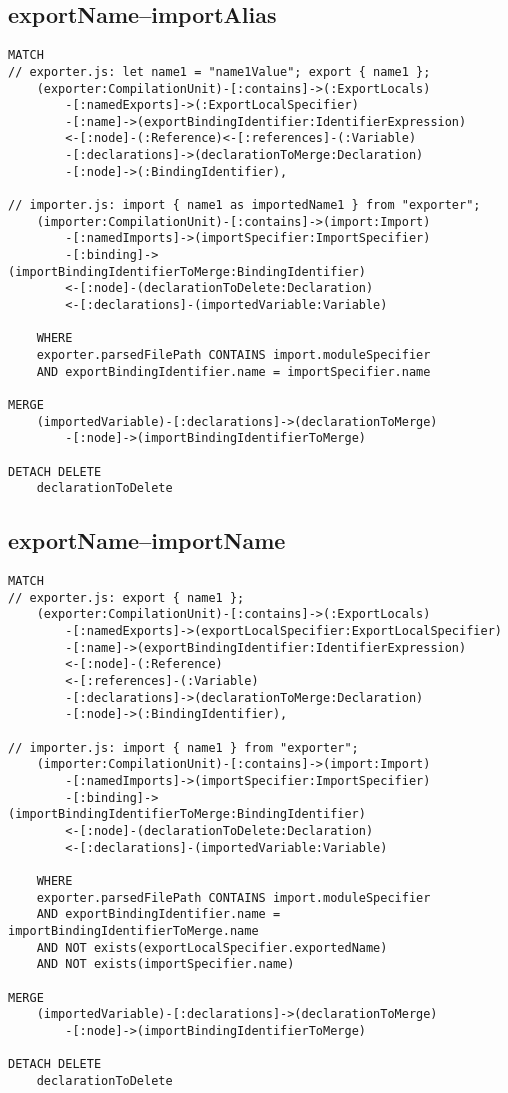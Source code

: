 \newpage
\subsection{exportName–importAlias}
\begin{lstlisting}[language=Cypher]
MATCH
// exporter.js: let name1 = "name1Value"; export { name1 };
    (exporter:CompilationUnit)-[:contains]->(:ExportLocals)
        -[:namedExports]->(:ExportLocalSpecifier)
        -[:name]->(exportBindingIdentifier:IdentifierExpression)
        <-[:node]-(:Reference)<-[:references]-(:Variable)
        -[:declarations]->(declarationToMerge:Declaration)
        -[:node]->(:BindingIdentifier),

// importer.js: import { name1 as importedName1 } from "exporter";
    (importer:CompilationUnit)-[:contains]->(import:Import)
        -[:namedImports]->(importSpecifier:ImportSpecifier)
        -[:binding]->(importBindingIdentifierToMerge:BindingIdentifier)
        <-[:node]-(declarationToDelete:Declaration)
        <-[:declarations]-(importedVariable:Variable)

    WHERE
    exporter.parsedFilePath CONTAINS import.moduleSpecifier
    AND exportBindingIdentifier.name = importSpecifier.name

MERGE
    (importedVariable)-[:declarations]->(declarationToMerge)
        -[:node]->(importBindingIdentifierToMerge)

DETACH DELETE
    declarationToDelete
\end{lstlisting}


\newpage
\subsection{exportName–importName}
\begin{lstlisting}[language=Cypher]
MATCH
// exporter.js: export { name1 };
    (exporter:CompilationUnit)-[:contains]->(:ExportLocals)
        -[:namedExports]->(exportLocalSpecifier:ExportLocalSpecifier)
        -[:name]->(exportBindingIdentifier:IdentifierExpression)
        <-[:node]-(:Reference)
        <-[:references]-(:Variable)
        -[:declarations]->(declarationToMerge:Declaration)
        -[:node]->(:BindingIdentifier),

// importer.js: import { name1 } from "exporter";
    (importer:CompilationUnit)-[:contains]->(import:Import)
        -[:namedImports]->(importSpecifier:ImportSpecifier)
        -[:binding]->(importBindingIdentifierToMerge:BindingIdentifier)
        <-[:node]-(declarationToDelete:Declaration)
        <-[:declarations]-(importedVariable:Variable)

    WHERE
    exporter.parsedFilePath CONTAINS import.moduleSpecifier
    AND exportBindingIdentifier.name = importBindingIdentifierToMerge.name
    AND NOT exists(exportLocalSpecifier.exportedName)
    AND NOT exists(importSpecifier.name)

MERGE
    (importedVariable)-[:declarations]->(declarationToMerge)
        -[:node]->(importBindingIdentifierToMerge)

DETACH DELETE
    declarationToDelete
\end{lstlisting}


